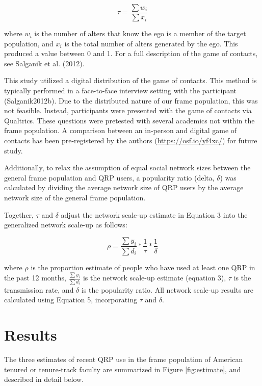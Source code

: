 \documentclass[jou]{apa6}
\theoremstyle{definition}
\theoremstyle{definition}
\theoremstyle{definition}
\theoremstyle{remark}
\begin{document}
\begin{equation}
\tau = \frac{\sum{w_i}}{\sum{x_i}}
\end{equation}

where \(w_i\) is the number of alters that know the ego is a member of
the target population, and \(x_i\) is the total number of alters
generated by the ego. This produced a value between 0 and 1. For a full
description of the game of contacts, see Salganik et al. (2012).

This study utilized a digital distribution of the game of contacts. This
method is typically performed in a face-to-face interview setting with
the participant (Salganik2012b). Due to the distributed nature of our
frame population, this was not feasible. Instead, participants were
presented with the game of contacts via Qualtrics. These questions were
pretested with several academics not within the frame population. A
comparison between an in-person and digital game of contacts has been
pre-registered by the authors (\url{https://osf.io/yf4xc/}) for future
study.

Additionally, to relax the assumption of equal social network sizes
between the general frame population and QRP users, a popularity ratio
(delta, \(\delta\)) was calculated by dividing the average network size
of QRP users by the average network size of the general frame
population.

Together, \(\tau\) and \(\delta\) adjust the network scale-up estimate
in Equation 3 into the generalized network scale-up as follows:

\begin{equation}
\rho = \frac{\sum y_i}{\sum d_i} * \frac{1}{\tau} * \frac{1}{\delta}
\end{equation}

where \(\rho\) is the proportion estimate of people who have used at
least one QRP in the past 12 months, \(\frac{\sum y_i}{\sum d_i}\) is
the network scale-up estimate (equation 3), \(\tau\) is the transmission
rate, and \(\delta\) is the popularity ratio. All network scale-up
results are calculated using Equation 5, incorporating \(\tau\) and
\(\delta\).

\section{Results}\label{results}

The three estimates of recent QRP use in the frame population of
American tenured or tenure-track faculty are summarized in Figure
\ref{fig:estimate}, and described in detail below.
\end{document}
